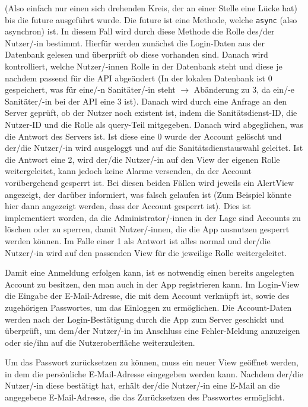         (Also einfach nur einen sich drehenden Kreis, der an einer Stelle eine Lücke hat)
        bis die \glqq future\grqq{} ausgeführt wurde. Die \glqq future\grqq{} ist eine Methode, welche 
        \texttt{async} (also asynchron) ist. In diesem Fall wird durch diese Methode die Rolle des/der Nutzer/-in 
        bestimmt. Hierfür werden zunächst die Login-Daten aus der Datenbank gelesen und 
        überprüft ob diese vorhanden sind. Danach wird kontrolliert, welche Nutzer/-innen Rolle in der 
        Datenbank steht und diese je nachdem passend für die API abgeändert (In der lokalen
        Datenbank ist 0 gespeichert, was für eine/-n Sanitäter/-in steht $\rightarrow$ 
        Abänderung zu 3, da ein/-e Sanitäter/-in bei der API eine 3 ist). Danach wird durch 
        eine Anfrage an den Server geprüft, ob der Nutzer noch existent ist, indem die 
        Sanitätsdienst-ID, die Nutzer-ID und die Rolle als \glqq query-Teil\grqq{} mitgegeben. Danach 
        wird abgeglichen, was die Antwort des Servers ist. Ist diese eine 0 wurde der Account 
        gelöscht und der/die Nutzer/-in wird ausgeloggt und auf die Sanitätsdienstauswahl 
        geleitet. Ist die Antwort eine 2, wird der/die Nutzer/-in auf den View der eigenen 
        Rolle weitergeleitet, kann jedoch keine Alarme versenden, da der Account 
        vorübergehend gesperrt ist. Bei diesen beiden Fällen wird jeweils ein AlertView 
        angezeigt, der darüber informiert, was \glqq falsch\grqq{} gelaufen ist (Zum Beispiel könnte
        hier dann angezeigt werden, dass der Account gesperrt ist).
        Dies ist implementiert worden, da die Administrator/-innen in der Lage sind Accounts zu löschen
        oder zu sperren, damit Nutzer/-innen, die die App ausnutzen gesperrt werden können.
        Im Falle einer 1 als Antwort ist alles normal und der/die Nutzer/-in wird auf den 
        passenden View für die jeweilige Rolle weitergeleitet. 

        \noindent Damit eine Anmeldung erfolgen kann, ist es notwendig einen bereits angelegten Account zu besitzen,
        den man auch in der App registrieren kann. Im Login-View die Eingabe der E-Mail-Adresse, 
        die mit dem Account verknüpft ist, sowie des zugehörigen Passwortes, um das Einloggen zu ermöglichen. 
        Die Account-Daten werden nach der Login-Bestätigung
        durch die App zum Server geschickt und überprüft, um dem/der Nutzer/-in
        im Anschluss eine Fehler-Meldung anzuzeigen oder sie/ihn auf die 
        Nutzeroberfläche weiterzuleiten.

        Um das Passwort zurücksetzen zu können, muss ein neuer \glqq View\grqq{} geöffnet werden, 
        in dem die persönliche E-Mail-Adresse eingegeben werden kann. Nachdem der/die Nutzer/-in
        diese bestätigt hat, erhält der/die Nutzer/-in eine E-Mail an die angegebene E-Mail-Adresse, die das
        Zurücksetzen des Passwortes ermöglicht.

